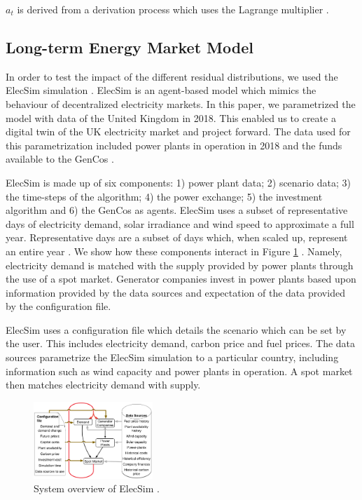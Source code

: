 \documentclass[final,3p,times,twocolumn,numbers]{elsarticle}
\begin{document}
\noindent $a_t$ is derived from a derivation process which uses the Lagrange multiplier \cite{Gzik2014}.

\subsection{Long-term Energy Market Model}


In order to test the impact of the different residual distributions, we used the ElecSim simulation \cite{Kell,Kell2020}. ElecSim is an agent-based model which mimics the behaviour of decentralized electricity markets. In this paper, we parametrized the model with data of the United Kingdom in 2018. This enabled us to create a digital twin of the UK electricity market and project forward. The data used for this parametrization included power plants in operation in 2018 and the funds available to the GenCos \cite{dukes_511, companies_house}.

ElecSim is made up of six components: 1) power plant data; 2) scenario data; 3) the time-steps of the algorithm; 4) the power exchange; 5) the investment algorithm and 6) the GenCos as agents. ElecSim uses a subset of representative days of electricity demand, solar irradiance and wind speed to approximate a full year. Representative days are a subset of days which, when scaled up, represent an entire year \cite{Kell2020}. We show how these components interact in Figure \ref{fig:model_details} \cite{Kell}. Namely, electricity demand is matched with the supply provided by power plants through the use of a spot market. Generator companies invest in power plants based upon information provided by the data sources and expectation of the data provided by the configuration file. 



ElecSim uses a configuration file which details the scenario which can be set by the user. This includes electricity demand, carbon price and fuel prices. The data sources parametrize the ElecSim simulation to a particular country, including information such as wind capacity and power plants in operation. A spot market then matches electricity demand with supply.



\begin{figure}
\centering
    \includegraphics[width=0.4\textwidth,natwidth=610,natheight=400]{figures/methods/System_overview_large.png}
    \caption{System overview of ElecSim \cite{Kell}.}
    \label{fig:model_details}
\end{figure}
\end{document}
